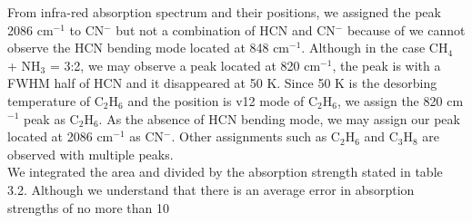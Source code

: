 From infra-red absorption spectrum and their positions, we assigned the peak 2086 cm$^{-1}$ to CN$^-$  but not a combination of HCN and CN$^-$ because of we cannot observe the HCN bending mode located at 848 cm$^{-1}$. Although in the case CH$_4$ + NH$_3$ = 3:2, we may observe a peak located at 820 cm$^{-1}$, the peak is with a FWHM half of HCN and it disappeared at 50 K. Since 50 K is the desorbing temperature of C$_2$H$_6$ and the position is v12 mode of C$_2$H$_6$, we assign the 820 cm$^{-1}$ peak as C$_2$H$_6$. As the absence of HCN bending mode, we may assign our peak located at 2086 cm$^{-1}$ as CN$^-$. Other assignments such as C$_2$H$_6$ and C$_3$H$_8$ are observed with multiple peaks.\\
We integrated the area and divided by the absorption strength stated in table 3.2. Although we understand that there is an average error in absorption strengths of no more than 10 %
